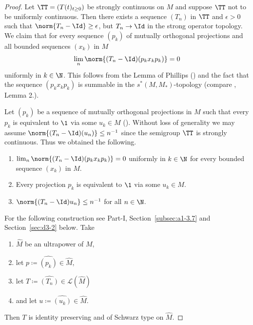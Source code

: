 \begin{proof}
Let $\TT = (T(t)_{t \geq 0})$ be strongly continuous on $M$ and suppose $\TT$ not to be uniformly continuous.
Then there exists a sequence $(T_n)$  in  $ \TT $ and $\epsilon > 0$ such that $\norm{T_n - \Id} \geq \epsilon$, 
but $T_n \to \Id$ in the strong operator topology.
We claim that for every sequence $(p_{k})$ of mutually orthogonal projections and all bounded sequences $(x_{k})$ 
in $M$
\[
\lim_n \norm{(T_n - \Id)(p_{k} x_{k} p_{k})} = 0
\]
uniformly in $k \in \N$.
This follows from the {Lemma of Phillips} (\textcite[Lemma II.10.3]{schaefer:1974}) and the fact that the sequence $(p_{k} x_{k} p_{k})$ is summable in the $s^{*}(M,M_*)$-topology (compare \textcite{elliot:1972}, Lemma 2.).

Let $(p_{k})$ be a sequence of mutually orthogonal projections in $M$ such that every $p_{k}$ is equivalent to $\1$ via some $u_{k} \in M$ (\textcite[2.2]{sakai:1971}).
Without loss of generality we may assume $\norm{(T_n - \Id)(u_n)} \leq n^{-1}$ since the semigroup $\TT$ is strongly continuous.
Thus we obtained the following.
\begin{enumerate}[\upshape (i)]
\item 
$\lim_n \norm{(T_n - \Id)(p_{k} x_{k} p_{k})} = 0$ uniformly in $k \in \N$ for every bounded sequence $(x_{k})$ in $M$.
\item 
Every projection $p_{k}$ is equivalent to $\1$ via some $u_{k} \in M$.
\item 
$\norm{(T_n - \Id)u_n} \leq n^{-1}$ for all $n \in \N$.
\end{enumerate}
For the following construction see Part-I, Section~\ref{subsec:a1-3.7} and Section~\ref{sec:d3-2} below.
Take
\begin{enumerate}[\upshape (i)]
\item
$\widehat{M}$ be an ultrapower of\/ $M$,

\item
let $p \coloneq \widehat{(p_{k})} \in \widehat{M}$,

\item
let $T \coloneq \widehat{(T_{n}) }\in \mathcal{L}(\widehat{M})$

\item
and let $u \coloneq \widehat{(u_{k})}  \in \widehat{M}$.

\end{enumerate}
Then $T$ is identity preserving and of Schwarz type on $\widehat{M}$.


\end{proof}
